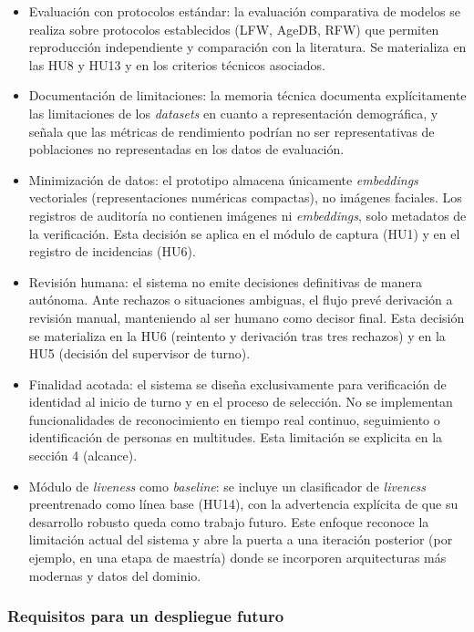 \documentclass[
  11pt, %
]{charter}
\begin{document}
\begin{itemize}
  \item Evaluación con protocolos estándar: la evaluación comparativa de modelos se realiza sobre protocolos establecidos (LFW, AgeDB, RFW) que permiten reproducción independiente y comparación con la literatura. Se materializa en las HU8 y HU13 y en los criterios técnicos asociados.
  \item Documentación de limitaciones: la memoria técnica documenta explícitamente las limitaciones de los \textit{datasets} en cuanto a representación demográfica, y señala que las métricas de rendimiento podrían no ser representativas de poblaciones no representadas en los datos de evaluación.
  \item Minimización de datos: el prototipo almacena únicamente \textit{embeddings} vectoriales (representaciones numéricas compactas), no imágenes faciales. Los registros de auditoría no contienen imágenes ni \textit{embeddings}, solo metadatos de la verificación. Esta decisión se aplica en el módulo de captura (HU1) y en el registro de incidencias (HU6).
  \item Revisión humana: el sistema no emite decisiones definitivas de manera autónoma. Ante rechazos o situaciones ambiguas, el flujo prevé derivación a revisión manual, manteniendo al ser humano como decisor final. Esta decisión se materializa en la HU6 (reintento y derivación tras tres rechazos) y en la HU5 (decisión del supervisor de turno).
  \item Finalidad acotada: el sistema se diseña exclusivamente para verificación de identidad al inicio de turno y en el proceso de selección. No se implementan funcionalidades de reconocimiento en tiempo real continuo, seguimiento o identificación de personas en multitudes. Esta limitación se explicita en la sección 4 (alcance).
  \item Módulo de \textit{liveness} como \textit{baseline}: se incluye un clasificador de \textit{liveness} preentrenado como línea base (HU14), con la advertencia explícita de que su desarrollo robusto queda como trabajo futuro. Este enfoque reconoce la limitación actual del sistema y abre la puerta a una iteración posterior (por ejemplo, en una etapa de maestría) donde se incorporen arquitecturas más modernas y datos del dominio.
\end{itemize}

\subsubsection{Requisitos para un despliegue futuro}
\end{document}
